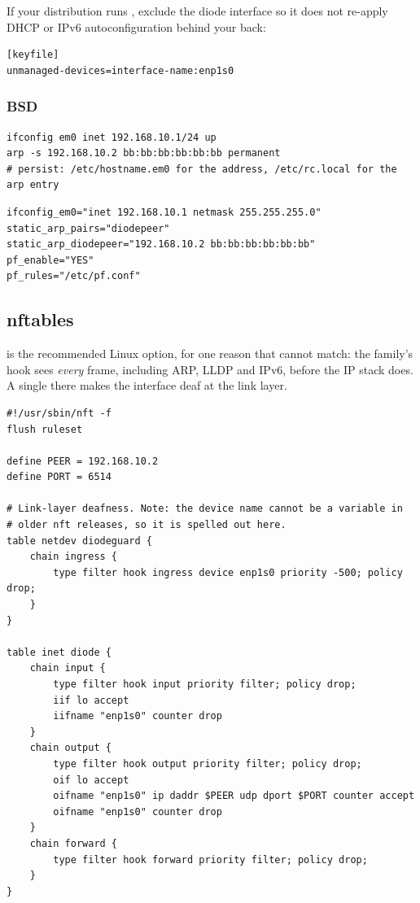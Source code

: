 \documentclass[11pt,a4paper]{article}
\begin{document}
If your distribution runs , exclude the diode interface
so it does not re-apply DHCP or IPv6 autoconfiguration behind your back:

\begin{lstlisting}[style=conf,caption={\file{/etc/NetworkManager/conf.d/90-diode.conf}}]
[keyfile]
unmanaged-devices=interface-name:enp1s0
\end{lstlisting}

\subsubsection{BSD}

\begin{lstlisting}[style=shell,caption={OpenBSD}]
ifconfig em0 inet 192.168.10.1/24 up
arp -s 192.168.10.2 bb:bb:bb:bb:bb:bb permanent
# persist: /etc/hostname.em0 for the address, /etc/rc.local for the arp entry
\end{lstlisting}

\begin{lstlisting}[style=conf,caption={FreeBSD \file{/etc/rc.conf}}]
ifconfig_em0="inet 192.168.10.1 netmask 255.255.255.0"
static_arp_pairs="diodepeer"
static_arp_diodepeer="192.168.10.2 bb:bb:bb:bb:bb:bb"
pf_enable="YES"
pf_rules="/etc/pf.conf"
\end{lstlisting}

\subsection{nftables}

 is the recommended Linux option, for one reason that
 cannot match: the  family's  hook
sees \emph{every} frame, including ARP, LLDP and IPv6, before the IP stack
does. A single  there makes the interface deaf at the link
layer.

\begin{lstlisting}[style=nft,caption={\file{/etc/nftables.conf} --- SOURCE host (transmit only)}]
#!/usr/sbin/nft -f
flush ruleset

define PEER = 192.168.10.2
define PORT = 6514

# Link-layer deafness. Note: the device name cannot be a variable in
# older nft releases, so it is spelled out here.
table netdev diodeguard {
    chain ingress {
        type filter hook ingress device enp1s0 priority -500; policy drop;
    }
}

table inet diode {
    chain input {
        type filter hook input priority filter; policy drop;
        iif lo accept
        iifname "enp1s0" counter drop
    }
    chain output {
        type filter hook output priority filter; policy drop;
        oif lo accept
        oifname "enp1s0" ip daddr $PEER udp dport $PORT counter accept
        oifname "enp1s0" counter drop
    }
    chain forward {
        type filter hook forward priority filter; policy drop;
    }
}
\end{lstlisting}
\end{document}
